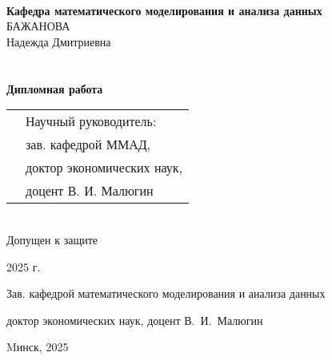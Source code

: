 \setcounter{page}{1}
\thispagestyle{empty}
\begin{center}
\\
\\
\\
\textbf{Кафедра математического моделирования и анализа данных}\\
\vspace{2cm}
БАЖАНОВА\\
\vspace{0.1cm}
Надежда Дмитриевна\\
\vspace{2cm}
\bf
{}\\
\\
\vspace{1.6cm}
\rm Дипломная работа
\vspace{2.1cm}
\end{center}
\begin{tabular}{ll}
\hspace{9.5cm}
&Научный руководитель:\\
&зав. кафедрой ММАД,\\
&доктор экономических наук,\\
&доцент В. И. Малюгин\\[2cm]
\end{tabular}\\
\setlength{\parindent}{0mm}
\indent Допущен к защите\par
\textquote{\underline{\hspace{8mm}}} \underline{\hspace{3cm}} 2025 г.\par
Зав. кафедрой математического моделирования и анализа данных\par
доктор экономических наук, доцент В.~И.~Малюгин\par
\vspace{2.5cm}
\setlength{\parindent}{10mm}
\begin{center}
    Mинск, 2025
\end{center}
